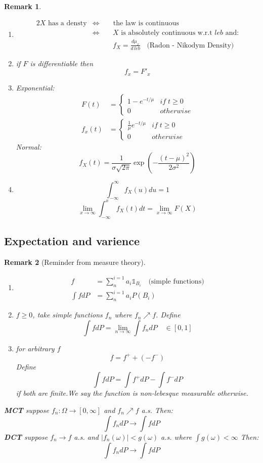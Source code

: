 \documentclass[12pt]{article}
\newtheorem*{remark}{Remark}
\begin{document}
\begin{remark} \quad \\
\begin{enumerate}[(1)]

\item \begin{alignat*}{2} X \text{ has a densty}  &\Leftrightarrow & &\text{ the law is continuous}\\
&\Leftrightarrow & & \; X \text{ is absolutely continuous w.r.t $leb$ and:} \\ & & & \; f_X = \frac{d\mu_x}{d\, leb}\; \; \text{     (Radon - Nikodym Density)} \end{alignat*}
\item if $F$ is differentiable then \[f_x = F'_x\]
\item Exponential: \begin{align*} F(t) &= \begin{cases}
1-e^{ - t/\mu} &if \;  t\geq 0\\
0 & otherwise \end{cases} \\
f_x(t) &= \begin{cases}
\frac{1}{\mu}e^{- t/\mu} &if \;  t\geq 0\\
0 & otherwise \end{cases} \end{align*} 
Normal:
\[f_X(t) = \frac{1}{\sigma \sqrt{2\pi}}\exp(- \frac{(t-\mu)^2}{2 \sigma^2})\]
\item \[\int_{-\infty}^{\infty}f_X(u)du = 1\]
\[ \lim_{x \rightarrow \infty}\int_{-\infty}^{x}f_X(t)dt = \lim_{x \rightarrow \infty}F(X)\]
\end{enumerate}
\end{remark}

\subsection{Expectation and varience}

\begin{remark}[Reminder from measure theory]\quad \\
\begin{enumerate}
\item \begin{align*} f &= \sum_{n}^{i=1}a_i\mathbb{1}_{B_i} \quad \text{(simple functions)}\\
\int f dP &= \sum_{n}^{i=1}a_iP(B_i) \end{align*}
\item $f \geq 0 $, take simple functions $f_n$ where $f_n \nearrow f$. Define
\[\int f dP = \lim_{n \rightarrow \infty}\int f_n dP \quad \in [0,1]\]
\item for arbitrary $f$
\[ f = f^{+}+ ( - f^{-}) \]
Define
\[\int f dP = \int f^{+} dP  - \int f^{-} dP\]
if both are finite.We say the function is non-lebesque measurable otherwise.
\end{enumerate}
\textbf{MCT} suppose $f_n: \Omega \rightarrow [0,\infty]$ and $f_n \nearrow f$ a.s. Then:
\[\int f_n dP \rightarrow \int f dP\]
\textbf{DCT} suppose $f_n \rightarrow f$ a.s. and $|f_n(\omega)| < g(\omega)$ a.s. where $\int g(\omega) < \infty$ Then:
\[\int f_n dP \rightarrow \int f dP\]
\end{remark}
\end{document}

